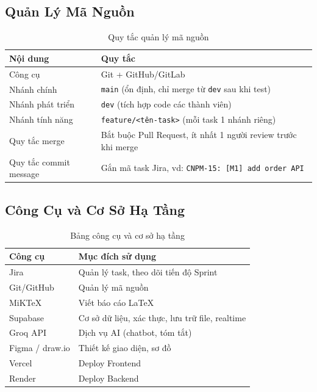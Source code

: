 \subsection{Quản Lý Mã Nguồn}

\begin{table}[H]
  \centering
  \begin{tabularx}{\textwidth}{|l|X|}
    \hline
    \textbf{Nội dung} & \textbf{Quy tắc} \\
    \hline
    Công cụ & Git + GitHub/GitLab \\ \hline
    Nhánh chính & \texttt{main} (ổn định, chỉ merge từ \texttt{dev} sau khi test) \\ \hline
    Nhánh phát triển & \texttt{dev} (tích hợp code các thành viên) \\ \hline
    Nhánh tính năng & \texttt{feature/<tên-task>} (mỗi task 1 nhánh riêng) \\ \hline
    Quy tắc merge & Bắt buộc Pull Request, ít nhất 1 người review trước khi merge \\ \hline
    Quy tắc commit message & Gắn mã task Jira, vd: \texttt{CNPM-15: [M1] add order API} \\
    \hline
  \end{tabularx}
  \caption{Quy tắc quản lý mã nguồn}
  \label{tab:source_management}
\end{table}

\subsection{Công Cụ và Cơ Sở Hạ Tầng}

\begin{table}[H]
  \centering
  \begin{tabularx}{\textwidth}{|l|X|}
    \hline
    \textbf{Công cụ} & \textbf{Mục đích sử dụng} \\
    \hline
    Jira & Quản lý task, theo dõi tiến độ Sprint \\ \hline
    Git/GitHub & Quản lý mã nguồn \\ \hline
    MiKTeX & Viết báo cáo LaTeX \\ \hline
    Supabase & Cơ sở dữ liệu, xác thực, lưu trữ file, realtime \\ \hline
    Groq API & Dịch vụ AI (chatbot, tóm tắt) \\ \hline
    Figma / draw.io & Thiết kế giao diện, sơ đồ \\ \hline
    Vercel & Deploy Frontend \\ \hline
    Render & Deploy Backend \\
    \hline
  \end{tabularx}
  \caption{Bảng công cụ và cơ sở hạ tầng}
  \label{tab:tools}
\end{table}
